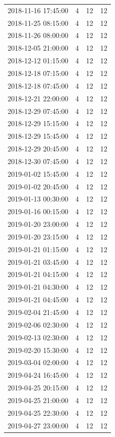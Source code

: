 \begin{tabular}{lrrr}
2018-11-16 17:45:00 & 4 & 12 & 12 \\
2018-11-25 08:15:00 & 4 & 12 & 12 \\
2018-11-26 08:00:00 & 4 & 12 & 12 \\
2018-12-05 21:00:00 & 4 & 12 & 12 \\
2018-12-12 01:15:00 & 4 & 12 & 12 \\
2018-12-18 07:15:00 & 4 & 12 & 12 \\
2018-12-18 07:45:00 & 4 & 12 & 12 \\
2018-12-21 22:00:00 & 4 & 12 & 12 \\
2018-12-29 07:45:00 & 4 & 12 & 12 \\
2018-12-29 15:15:00 & 4 & 12 & 12 \\
2018-12-29 15:45:00 & 4 & 12 & 12 \\
2018-12-29 20:45:00 & 4 & 12 & 12 \\
2018-12-30 07:45:00 & 4 & 12 & 12 \\
2019-01-02 15:45:00 & 4 & 12 & 12 \\
2019-01-02 20:45:00 & 4 & 12 & 12 \\
2019-01-13 00:30:00 & 4 & 12 & 12 \\
2019-01-16 00:15:00 & 4 & 12 & 12 \\
2019-01-20 23:00:00 & 4 & 12 & 12 \\
2019-01-20 23:15:00 & 4 & 12 & 12 \\
2019-01-21 01:15:00 & 4 & 12 & 12 \\
2019-01-21 03:45:00 & 4 & 12 & 12 \\
2019-01-21 04:15:00 & 4 & 12 & 12 \\
2019-01-21 04:30:00 & 4 & 12 & 12 \\
2019-01-21 04:45:00 & 4 & 12 & 12 \\
2019-02-04 21:45:00 & 4 & 12 & 12 \\
2019-02-06 02:30:00 & 4 & 12 & 12 \\
2019-02-13 02:30:00 & 4 & 12 & 12 \\
2019-02-20 15:30:00 & 4 & 12 & 12 \\
2019-03-04 02:00:00 & 4 & 12 & 12 \\
2019-04-24 16:45:00 & 4 & 12 & 12 \\
2019-04-25 20:15:00 & 4 & 12 & 12 \\
2019-04-25 21:00:00 & 4 & 12 & 12 \\
2019-04-25 22:30:00 & 4 & 12 & 12 \\
2019-04-27 23:00:00 & 4 & 12 & 12 \\

\end{tabular}
